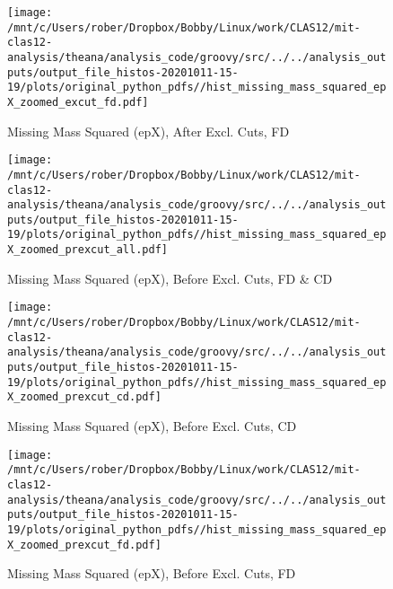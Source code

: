 \documentclass{article}
\begin{document}
\begin{landscape}
    \begin{figure}[h]
        \centering

        \texttt{[image: /mnt/c/Users/rober/Dropbox/Bobby/Linux/work/CLAS12/mit-clas12-analysis/theana/analysis\_code/groovy/src/../../analysis\_outputs/output\_file\_histos-20201011-15-19/plots/original\_python\_pdfs//hist\_missing\_mass\_squared\_epX\_zoomed\_excut\_fd.pdf]}
        \captionsetup{textformat=empty,labelformat=blank}
        \caption{Missing Mass Squared (epX), After Excl. Cuts, FD}
    \end{figure}
    \clearpage
    
    \begin{figure}[h]
        \centering

        \texttt{[image: /mnt/c/Users/rober/Dropbox/Bobby/Linux/work/CLAS12/mit-clas12-analysis/theana/analysis\_code/groovy/src/../../analysis\_outputs/output\_file\_histos-20201011-15-19/plots/original\_python\_pdfs//hist\_missing\_mass\_squared\_epX\_zoomed\_prexcut\_all.pdf]}
        \captionsetup{textformat=empty,labelformat=blank}
        \caption{Missing Mass Squared (epX), Before Excl. Cuts, FD \& CD}
    \end{figure}
    \clearpage
    
    \begin{figure}[h]
        \centering

        \texttt{[image: /mnt/c/Users/rober/Dropbox/Bobby/Linux/work/CLAS12/mit-clas12-analysis/theana/analysis\_code/groovy/src/../../analysis\_outputs/output\_file\_histos-20201011-15-19/plots/original\_python\_pdfs//hist\_missing\_mass\_squared\_epX\_zoomed\_prexcut\_cd.pdf]}
        \captionsetup{textformat=empty,labelformat=blank}
        \caption{Missing Mass Squared (epX), Before Excl. Cuts, CD}
    \end{figure}
    \clearpage
    
    \begin{figure}[h]
        \centering

        \texttt{[image: /mnt/c/Users/rober/Dropbox/Bobby/Linux/work/CLAS12/mit-clas12-analysis/theana/analysis\_code/groovy/src/../../analysis\_outputs/output\_file\_histos-20201011-15-19/plots/original\_python\_pdfs//hist\_missing\_mass\_squared\_epX\_zoomed\_prexcut\_fd.pdf]}
        \captionsetup{textformat=empty,labelformat=blank}
        \caption{Missing Mass Squared (epX), Before Excl. Cuts, FD}
    \end{figure}
    \clearpage
    
    \begin{figure}[h]
        \centering


\end{figure}
\end{landscape}
\end{document}

